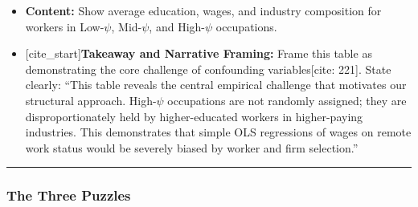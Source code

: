 \documentclass[
  11pt,
  letterpaper,
  DIV=11,
  numbers=noendperiod]{scrartcl}
\providecommand{\tightlist}{%
  \setlength{\itemsep}{0pt}\setlength{\parskip}{0pt}}\usepackage{longtable,booktabs,array}
\begin{document}
\begin{itemize}
  \begin{itemize}
  \tightlist
  \item
    \textbf{Content:} Show average education, wages, and industry
    composition for workers in Low-\(\psi\), Mid-\(\psi\), and
    High-\(\psi\) occupations.
  \item
    {[}cite\_start{]}\textbf{Takeaway and Narrative Framing:} Frame this
    table as demonstrating the core challenge of confounding
    variables{[}cite: 221{]}. State clearly: ``This table reveals the
    central empirical challenge that motivates our structural approach.
    High-\(\psi\) occupations are not randomly assigned; they are
    disproportionately held by higher-educated workers in higher-paying
    industries. This demonstrates that simple OLS regressions of wages
    on remote work status would be severely biased by worker and firm
    selection.''
  \end{itemize}
\end{itemize}

\begin{center}\rule{0.5\linewidth}{0.5pt}\end{center}

\subsubsection{\texorpdfstring{\textbf{The Three
Puzzles}}{The Three Puzzles}}\label{the-three-puzzles}
\end{document}
